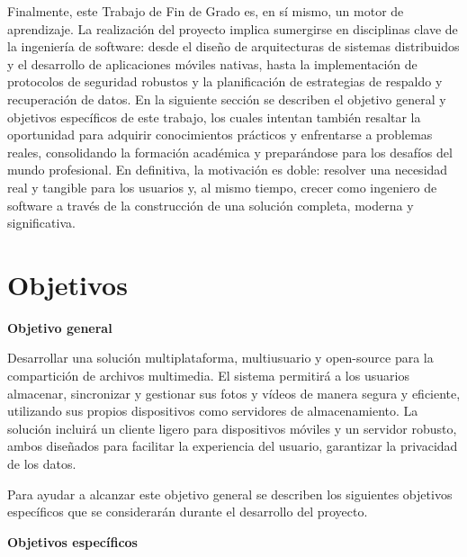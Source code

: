 Finalmente, este Trabajo de Fin de Grado es, en sí mismo, un motor de aprendizaje. La realización del proyecto implica sumergirse en disciplinas clave de la ingeniería de software: desde el diseño de arquitecturas de sistemas distribuidos y el desarrollo de aplicaciones móviles nativas, hasta la implementación de protocolos de seguridad robustos y la planificación de estrategias de respaldo y recuperación de datos. En la siguiente sección se describen el objetivo general y objetivos específicos de este trabajo, los cuales intentan también resaltar la oportunidad para adquirir conocimientos prácticos y enfrentarse a problemas reales, consolidando la formación académica y preparándose para los desafíos del mundo profesional. En definitiva, la motivación es doble: resolver una necesidad real y tangible para los usuarios y, al mismo tiempo, crecer como ingeniero de software a través de la construcción de una solución completa, moderna y significativa.

\section{Objetivos}
\label{sec:objetivos}

\textbf{Objetivo general}

Desarrollar una solución multiplataforma, multiusuario y open-source para la compartición de archivos multimedia. El sistema permitirá a los usuarios almacenar, sincronizar y gestionar sus fotos y vídeos de manera segura y eficiente, utilizando sus propios dispositivos como servidores de almacenamiento. La solución incluirá un cliente ligero para dispositivos móviles y un servidor robusto, ambos diseñados para facilitar la experiencia del usuario, garantizar la privacidad de los datos.

Para ayudar a alcanzar este objetivo general se describen los siguientes objetivos específicos que se considerarán durante el desarrollo del proyecto.

\textbf{Objetivos específicos}

